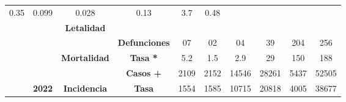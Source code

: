 \begin{tabular}{lccc|cccccc|}
		\multicolumn{1}{c|}{\cellcolor[HTML]{FAF0D7}0.35} &
		\multicolumn{1}{c|}{\cellcolor[HTML]{FAF0D7}0.099} &
		\multicolumn{1}{c|}{\cellcolor[HTML]{FAF0D7}0.028} &
		\multicolumn{1}{c|}{\cellcolor[HTML]{FAF0D7}0.13} &
		\multicolumn{1}{c|}{\cellcolor[HTML]{FAF0D7}3.7} &
		\cellcolor[HTML]{FAF0D7}0.48 \\ \cline{4-10} 
		\multicolumn{1}{l|}{} &
		\multicolumn{1}{c|}{\cellcolor[HTML]{E2EFDA}} &
		\multicolumn{1}{c|}{\multirow{-2}{*}{\cellcolor[HTML]{E2EFDA}\textbf{Letalidad}}} &
		\cellcolor[HTML]{E2EFDA} &
		\multicolumn{1}{c|}{\cellcolor[HTML]{E2EFDA}} &
		\multicolumn{1}{c|}{\cellcolor[HTML]{E2EFDA}} &
		\multicolumn{1}{c|}{\cellcolor[HTML]{E2EFDA}} &
		\multicolumn{1}{c|}{\cellcolor[HTML]{E2EFDA}} &
		\multicolumn{1}{c|}{\cellcolor[HTML]{E2EFDA}} &
		\cellcolor[HTML]{E2EFDA} \\ \cline{3-3}
		\multicolumn{1}{l|}{} &
		\multicolumn{1}{c|}{\cellcolor[HTML]{E2EFDA}} &
		\multicolumn{1}{c|}{\cellcolor[HTML]{E2EFDA}} &
		\multirow{-2}{*}{\cellcolor[HTML]{E2EFDA}\textbf{Defunciones}} &
		\multicolumn{1}{c|}{\multirow{-2}{*}{\cellcolor[HTML]{E2EFDA}07}} &
		\multicolumn{1}{c|}{\multirow{-2}{*}{\cellcolor[HTML]{E2EFDA}02}} &
		\multicolumn{1}{c|}{\multirow{-2}{*}{\cellcolor[HTML]{E2EFDA}04}} &
		\multicolumn{1}{c|}{\multirow{-2}{*}{\cellcolor[HTML]{E2EFDA}39}} &
		\multicolumn{1}{c|}{\multirow{-2}{*}{\cellcolor[HTML]{E2EFDA}204}} &
		\multirow{-2}{*}{\cellcolor[HTML]{E2EFDA}256} \\ \cline{4-10} 
		\multicolumn{1}{l|}{} &
		\multicolumn{1}{c|}{\cellcolor[HTML]{E2EFDA}} &
		\multicolumn{1}{c|}{\multirow{-2}{*}{\cellcolor[HTML]{E2EFDA}\textbf{Mortalidad}}} &
		\cellcolor[HTML]{E2EFDA}\textbf{Tasa *} &
		\multicolumn{1}{c|}{\cellcolor[HTML]{E2EFDA}5.2} &
		\multicolumn{1}{c|}{\cellcolor[HTML]{E2EFDA}1.5} &
		\multicolumn{1}{c|}{\cellcolor[HTML]{E2EFDA}2.9} &
		\multicolumn{1}{c|}{\cellcolor[HTML]{E2EFDA}29} &
		\multicolumn{1}{c|}{\cellcolor[HTML]{E2EFDA}150} &
		\cellcolor[HTML]{E2EFDA}188 \\ \cline{3-10} 
		\multicolumn{1}{l|}{} &
		\multicolumn{1}{c|}{\cellcolor[HTML]{E2EFDA}} &     
		\multicolumn{1}{c|}{\cellcolor[HTML]{E2EFDA}} &
		\cellcolor[HTML]{E2EFDA}\textbf{Casos +} &
		\multicolumn{1}{c|}{\cellcolor[HTML]{E2EFDA}2109} &
		\multicolumn{1}{c|}{\cellcolor[HTML]{E2EFDA}2152} &
		\multicolumn{1}{c|}{\cellcolor[HTML]{E2EFDA}14546} &
		\multicolumn{1}{c|}{\cellcolor[HTML]{E2EFDA}28261} &
		\multicolumn{1}{c|}{\cellcolor[HTML]{E2EFDA}5437} &
		\cellcolor[HTML]{E2EFDA}52505 \\ \cline{4-10} 
		\multicolumn{1}{l|}{} &
		\multicolumn{1}{c|}{\multirow{-6}{*}{\cellcolor[HTML]{E2EFDA}\textbf{2022}}} &
		\multicolumn{1}{c|}{\multirow{-2}{*}{\cellcolor[HTML]{E2EFDA}\textbf{Incidencia}}} &
		\cellcolor[HTML]{E2EFDA}\textbf{Tasa} &
		\multicolumn{1}{c|}{\cellcolor[HTML]{E2EFDA}1554} &
		\multicolumn{1}{c|}{\cellcolor[HTML]{E2EFDA}1585} &
		\multicolumn{1}{c|}{\cellcolor[HTML]{E2EFDA}10715} &
		\multicolumn{1}{c|}{\cellcolor[HTML]{E2EFDA}20818} &
		\multicolumn{1}{c|}{\cellcolor[HTML]{E2EFDA}4005} &
		\cellcolor[HTML]{E2EFDA}38677 \\ \cline{2-10} 	
	\end{tabular}